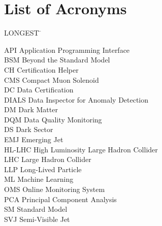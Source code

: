 \chapter*{List of Acronyms}

\noindent
\vspace{-1.75\baselineskip}
\begin{tabbing}
	LONGEST \=  \kill %

	API     \> Application Programming Interface\\
	BSM     \> Beyond the Standard Model\\
	CH      \> Certification Helper\\
	CMS     \> Compact Muon Solenoid\\
	DC      \> Data Certification\\
	DIALS   \> Data Inspector for Anomaly Detection\\
	DM      \> Dark Matter\\
	DQM     \> Data Quality Monitoring\\
	DS      \> Dark Sector\\
	EMJ     \> Emerging Jet\\
	HL-LHC  \> High Luminosity Large Hadron Collider\\
	LHC     \> Large Hadron Collider\\
	LLP     \> Long-Lived Particle\\
	ML      \> Machine Learning\\
	OMS     \> Online Monitoring System\\
	PCA     \> Principal Component Analysis\\
	SM      \> Standard Model\\
	SVJ     \> Semi-Visible Jet\\

\end{tabbing}